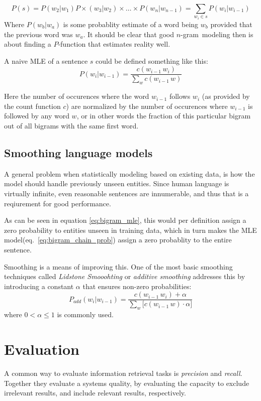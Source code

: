 \documentclass[a4paper,11pt]{kth-mag}
\newcommand{\ngram}{$n$-gram}
\begin{document}
\begin{equation} \label{eq:bigram_chain_prob}
P(s) = P(w_2 | w_1)P\times (w_3 | w_2) \times \dots \times P(w_n | w_{n-1}) = \sum_{w_i \in s}P(w_i|w_{i-1})
\end{equation}
Where $P(w_b | w_a)$ is some probablity estimate of a word being $w_b$ provided that the previous word was $w_a$. It should be clear that good \ngram~modeling then is about finding a $P$-function that estimates reality well.

A naive \gls{MLE} of a sentence $s$ could be defined something like this:
\begin{equation} \label{eq:bigram_mle}
P(w_i|w_{i-1}) = \frac{c(w_{i-1}\,w_i)}{\sum_{w} c(w_{i-1}\, w)}
\end{equation}

Here the number of occurences where the word $w_{i-1}$ follows $w_i$ (as provided by the count function $c$) are normalized by the number of occurences where $w_{i-1}$ is followed by any word $w$, or in other words the fraction of this particular bigram out of all bigrams with the same first word.

\subsection{Smoothing language models}
A general problem when statistically modeling based on existing data, is how the model should handle previously unseen entities. Since human language is virtually infinite, even reasonable sentences are innumerable, and thus that is a reqiurement for good performance.

As can be seen in equation \ref{eq:bigram_mle}, this would per definition assign a zero probability to entities unseen in training data, which in turn makes the \gls{MLE} model(eq.~\ref{eq:bigram_chain_prob}) assign a zero probablity to the entire sentence\cite{chen_goodman}.

Smoothing is a means of improving this. One of the most basic smoothing techniques called \emph{Lidstone Smooohting} or \emph{additive smoothing} addresses this by introducing a constant $\alpha$ that ensures non-zero probabilities\cite{chen_goodman}:
\begin{equation} \label{eq:additive_smoothing}
P_{add}(w_i|w_{i-1}) = \frac{c(w_{i-1}\,w_i)+\alpha}{\sum_{w} \big[c(w_{i-1}\, w)\cdot\alpha\big]}
\end{equation}
where $0 < \alpha \leq 1$ is commonly used.

\section{Evaluation}
A common way to evaluate information retrieval tasks is \emph{precision} and \emph{recall}. Together they evaluate a systems quality, by evaluating the capacity to exclude irrelevant results, and include relevant results, respectively.
\end{document}
